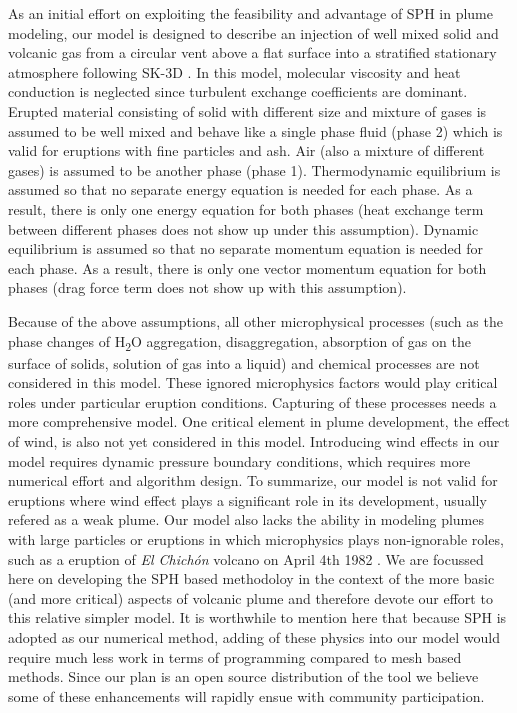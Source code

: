 \documentclass[journal abbreviation, manuscript]{copernicus}
\begin{document}
As an initial effort on exploiting the feasibility and advantage of SPH in plume modeling, our model is designed to describe an injection of well mixed solid and volcanic gas from a circular vent above a flat surface into a stratified stationary atmosphere following SK-3D \citep{suzuki2005numerical}. In this model, molecular viscosity and heat conduction is neglected since turbulent exchange coefficients are dominant. Erupted material consisting of solid with different size and mixture of gases is assumed to be well mixed and behave like a single phase fluid (phase 2) which is valid for eruptions with fine particles and ash. Air (also a mixture of different gases) is assumed to be another phase (phase 1). Thermodynamic equilibrium is assumed so that no separate energy equation is needed for each phase. As a result, there is only one energy equation for both phases (heat exchange term between different phases does not show up under this assumption). Dynamic equilibrium is assumed so that no separate momentum equation is needed for each phase. As a result, there is only one vector momentum equation for both phases (drag force term does not show up with this assumption). 

Because of the above assumptions, all other microphysical processes (such as the phase changes of \texorpdfstring{H\textsubscript{2}O}, aggregation, disaggregation, absorption of gas on the surface of solids, solution of gas into a liquid) and chemical processes are not considered in this model. These ignored microphysics factors would play critical roles under particular eruption conditions. Capturing of these processes needs a more comprehensive model. One critical element in plume development, the effect of wind, is also not yet considered in this model. Introducing wind effects in our model requires dynamic pressure boundary conditions, which requires more numerical effort and algorithm design. To summarize, our model is not valid for eruptions where wind effect plays a significant role in its development, usually refered as a weak plume. Our model also lacks the ability in modeling plumes with large particles or eruptions in which microphysics plays non-ignorable roles, such as a eruption of \textit{El Chich{\'o}n} volcano on April 4th 1982 \citep{sigurdsson19841982, folch2016fplume}. We are focussed here on developing the SPH based methodoloy in the context of the more basic (and more critical) aspects of volcanic plume and therefore devote our effort to this relative simpler model. It is worthwhile to mention here that because SPH is adopted as our numerical method, adding of these physics into our model would require much less work in terms of programming compared to mesh based methods. Since our plan is an open source distribution of the tool we believe some of these enhancements will rapidly ensue with community participation.
\end{document}
